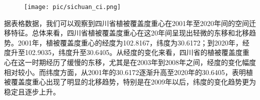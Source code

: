 \documentclass{article}
\begin{document}
		\begin{figure}[H]  %
			\centering
			\texttt{[image: pic/sichuan\_ci.png]} %
		\end{figure}
		
				
		\par 
		
		据表格数据，我们可以观察到四川省植被覆盖度重心在2001年至2020年间的空间迁移特征。总体来看，四川省植被覆盖度重心在这20年间呈现出轻微的东移和北移趋势。2001年，植被覆盖度重心的经度为102.8167，纬度为30.6172；到2020年，经度升至102.9035，纬度升至30.6405。从经度的变化来看，四川省的植被覆盖度重心在这一时期经历了缓慢的东移，尤其是在2003年到2008年之间，经度的变化幅度相对较小。而纬度方面，从2001年的30.6172逐渐升高至2020年的30.6405，表明植被覆盖度重心出现了明显的北移趋势，特别是在2009年以后，纬度的变化趋势更为稳定且逐步上升。
		
\end{document}
